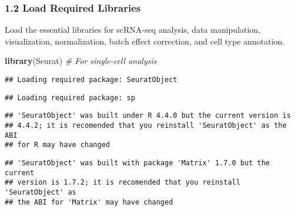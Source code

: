 \documentclass[
]{article}
\newenvironment{Shaded}{\begin{snugshade}}{\end{snugshade}}
\newcommand{\AttributeTok}[1]{\textcolor[rgb]{0.13,0.29,0.53}{#1}}
\newcommand{\CommentTok}[1]{\textcolor[rgb]{0.56,0.35,0.01}{\textit{#1}}}
\newcommand{\ConstantTok}[1]{\textcolor[rgb]{0.56,0.35,0.01}{#1}}
\newcommand{\DecValTok}[1]{\textcolor[rgb]{0.00,0.00,0.81}{#1}}
\newcommand{\FunctionTok}[1]{\textcolor[rgb]{0.13,0.29,0.53}{\textbf{#1}}}
\newcommand{\NormalTok}[1]{#1}
\newcommand{\SpecialCharTok}[1]{\textcolor[rgb]{0.81,0.36,0.00}{\textbf{#1}}}
\begin{document}
\begin{Shaded}
\end{Shaded}

\subsubsection{1.2 Load Required
Libraries}\label{load-required-libraries}

Load the essential libraries for scRNA-seq analysis, data manipulation,
visualization, normalization, batch effect correction, and cell type
annotation.

\begin{Shaded}
\begin{Highlighting}[]
\FunctionTok{library}\NormalTok{(Seurat)         }\CommentTok{\# For single{-}cell analysis}
\end{Highlighting}
\end{Shaded}

\begin{verbatim}
## Loading required package: SeuratObject
\end{verbatim}

\begin{verbatim}
## Loading required package: sp
\end{verbatim}

\begin{verbatim}
## 'SeuratObject' was built under R 4.4.0 but the current version is
## 4.4.2; it is recomended that you reinstall 'SeuratObject' as the ABI
## for R may have changed
\end{verbatim}

\begin{verbatim}
## 'SeuratObject' was built with package 'Matrix' 1.7.0 but the current
## version is 1.7.2; it is recomended that you reinstall 'SeuratObject' as
## the ABI for 'Matrix' may have changed
\end{verbatim}
\end{document}
